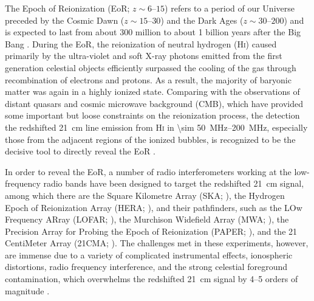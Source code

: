 \documentclass[modern]{aastex62}
\newcommand{\Hi}{H\textsc{i}}
\begin{document}
The Epoch of Reionization (EoR; $z \sim \numrange{6}{15}$) refers to
a period of our Universe preceded by the Cosmic Dawn
($z \sim \numrange{15}{30}$) and the Dark Ages ($z \sim \numrange{30}{200}$)
and is expected to last from about 300 million to about 1 billion years
after the Big Bang \citep[see][and references therein]{koopmans2015rev}.
During the EoR, the reionization of
neutral hydrogen (\Hi) caused primarily by the ultra-violet and soft
X-ray photons emitted from the first generation celestial objects
efficiently surpassed the cooling of the gas through
recombination of electrons and protons.
As a result, the majority of baryonic matter was again in a
highly ionized state.
Comparing with the observations of distant quasars and cosmic microwave
background (CMB), which have provided some important but loose
constraints on the reionization process, the detection the redshifted
21~cm line emission from \Hi{} in \SIrange{\sim 50}{200}{\MHz},
especially those from the adjacent regions of the ionized bubbles,
is recognized to be the decisive tool to directly reveal the EoR
\citep[see][for reviews]{zaroubi2013rev,furlanetto2016rev}.

In order to reveal the EoR, a number of radio interferometers working
at the low-frequency radio bands have been designed to target the
redshifted 21~cm signal, among which there are
the Square Kilometre Array (SKA; \citealt{mellema2013rev,koopmans2015rev}),
the Hydrogen Epoch of Reionization Array (HERA; \citealt{deboer2017}),
and their pathfinders, such as
the LOw Frequency ARray (LOFAR; \citealt{vanHaarlem2013}),
the Murchison Widefield Array (MWA; \citealt{bowman2013,tingay2013}),
the Precision Array for Probing the Epoch of Reionization
(PAPER; \citealt{parsons2010}),
and the 21 CentiMeter Array (21CMA; \citealt{zheng2016}).
The challenges met in these experiments, however, are immense
due to a variety of complicated instrumental effects,
ionospheric distortions, radio frequency interference, and the
strong celestial foreground contamination, which overwhelms the
redshifted 21~cm signal by \numrange{4}{5} orders of magnitude
\citep[see][for a review]{morales2010rev}.
\end{document}
